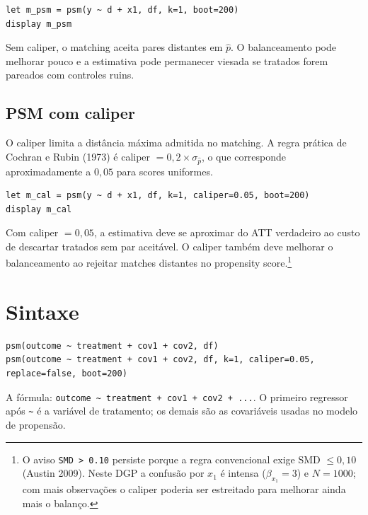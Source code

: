 \begin{lstlisting}[caption={PSM 1:1 sem caliper}]
let m_psm = psm(y ~ d + x1, df, k=1, boot=200)
display m_psm
\end{lstlisting}

Sem caliper, o matching aceita pares distantes em $\hat{p}$. O balanceamento
pode melhorar pouco e a estimativa pode permanecer viesada se tratados forem
pareados com controles ruins.

\subsection*{PSM com caliper}

O caliper limita a distância máxima admitida no matching. A regra prática
de Cochran e Rubin (1973) é caliper $= 0{,}2 \times \sigma_{\hat{p}}$, o
que corresponde aproximadamente a $0{,}05$ para scores uniformes.

\begin{lstlisting}[caption={PSM com caliper = 0.05}]
let m_cal = psm(y ~ d + x1, df, k=1, caliper=0.05, boot=200)
display m_cal
\end{lstlisting}

Com caliper $= 0{,}05$, a estimativa deve se aproximar do ATT verdadeiro ao
custo de descartar tratados sem par aceitável. O caliper também deve melhorar
o balanceamento ao rejeitar matches distantes no propensity score.\footnote{%
  O aviso \texttt{SMD > 0.10} persiste porque a regra convencional exige
  SMD $\leq 0{,}10$ (Austin 2009). Neste DGP a confusão por $x_1$ é intensa
  ($\beta_{x_1} = 3$) e $N = 1000$; com mais observações o caliper poderia
  ser estreitado para melhorar ainda mais o balanço.}

\section{Sintaxe}

\begin{lstlisting}
psm(outcome ~ treatment + cov1 + cov2, df)
psm(outcome ~ treatment + cov1 + cov2, df, k=1, caliper=0.05, replace=false, boot=200)
\end{lstlisting}

A fórmula: \lstinline{outcome ~ treatment + cov1 + cov2 + ...}. O primeiro
regressor após \lstinline{~} é a variável de tratamento; os demais são as
covariáveis usadas no modelo de propensão.

